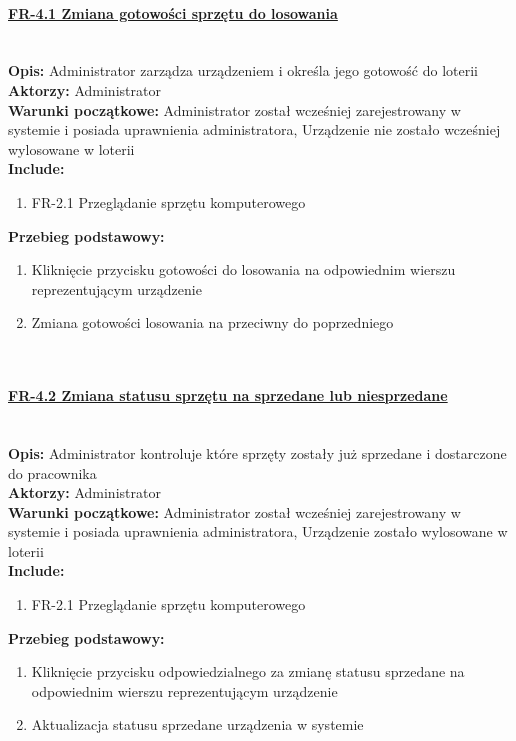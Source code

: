 \paragraph{\underline{FR-4.1 Zmiana gotowości sprzętu do losowania}}\mbox{}\\[1mm]
	\noindent\textbf{Opis:} Administrator zarządza urządzeniem i określa jego gotowość do loterii\\
	\noindent\textbf{Aktorzy:} Administrator\\
	\textbf{Warunki początkowe:} Administrator został wcześniej zarejestrowany w systemie i posiada uprawnienia administratora, Urządzenie nie zostało wcześniej wylosowane w loterii\\
	\textbf{Include:} 
	\begin{enumerate}[noparskip]
		\item FR-2.1 Przeglądanie sprzętu komputerowego
	\end{enumerate}
    \textbf{Przebieg podstawowy:}
	\begin{enumerate}[noparskip]
		\item Kliknięcie przycisku gotowości do losowania na odpowiednim wierszu reprezentującym urządzenie
		\item Zmiana gotowości losowania na przeciwny do poprzedniego
  \end{enumerate} \mbox{}\\[-11mm]

\paragraph{\underline{FR-4.2 Zmiana statusu sprzętu na sprzedane lub niesprzedane}}\mbox{}\\[1mm]
	\noindent\textbf{Opis:} Administrator kontroluje które sprzęty zostały już sprzedane i dostarczone do pracownika\\
	\noindent\textbf{Aktorzy:} Administrator\\
	\textbf{Warunki początkowe:} Administrator został wcześniej zarejestrowany w systemie i posiada uprawnienia administratora, Urządzenie zostało wylosowane w loterii\\
	\textbf{Include:} 
	\begin{enumerate}[noparskip]
		\item FR-2.1 Przeglądanie sprzętu komputerowego
	\end{enumerate}
  \textbf{Przebieg podstawowy:}
	\begin{enumerate}[noparskip]
		\item Kliknięcie przycisku odpowiedzialnego za zmianę statusu sprzedane na odpowiednim wierszu reprezentującym urządzenie
		\item Aktualizacja statusu sprzedane urządzenia w systemie
  \end{enumerate} \mbox{}\\[-11mm]

